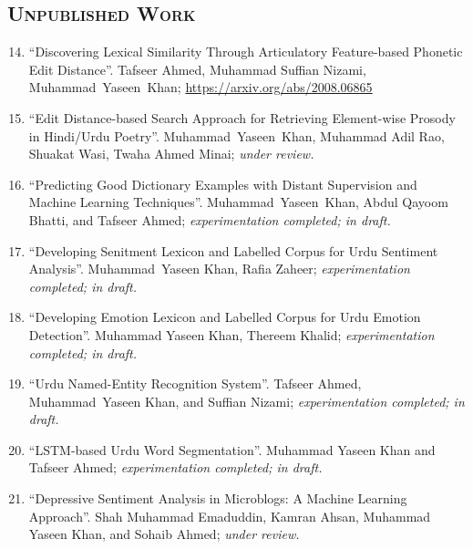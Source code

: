 \documentclass[a4paper, 10pt]{article}
\begin{document}
\subsection*{\normalfont\textsc{ Unpublished Work}}
\begin{enumerate}
\setcounter{enumi}{13}
\itemsep-4pt 

	\item ``Discovering Lexical Similarity Through Articulatory Feature-based Phonetic Edit Distance''. Tafseer Ahmed, Muhammad Suffian Nizami, \textcolor{NavyBlue}{Muhammad~Yaseen~Khan}; \url{https://arxiv.org/abs/2008.06865}

	\item ``Edit Distance-based Search Approach for Retrieving  Element-wise Prosody in Hindi/Urdu Poetry''. \textcolor{NavyBlue}{Muhammad~Yaseen~Khan}, Muhammad Adil Rao, Shuakat Wasi, Twaha Ahmed Minai; \emph{\small under review.}
	
	\item ``Predicting Good Dictionary Examples with Distant Supervision and Machine Learning Techniques''. \textcolor{NavyBlue}{Muhammad~Yaseen~Khan}, Abdul Qayoom Bhatti, and Tafseer Ahmed; \emph{\small experimentation completed; in draft.}
	
	\item ``Developing Senitment Lexicon and Labelled Corpus for Urdu Sentiment Analysis''. \textcolor{NavyBlue}{Muhammad~Yaseen Khan}, Rafia Zaheer; \emph{\small experimentation completed; in draft.}
	
	\item ``Developing Emotion Lexicon and Labelled Corpus for Urdu Emotion Detection''. \textcolor{NavyBlue}{Muhammad Yaseen Khan}, Thereem Khalid; \emph{\small experimentation completed; in draft.}
	

	\item ``Urdu Named-Entity Recognition System''. Tafseer Ahmed, \textcolor{NavyBlue}{Muhammad~Yaseen Khan}, and Suffian Nizami; \emph{\small experimentation completed; in draft.}
	
	\item ``LSTM-based Urdu Word Segmentation''. \textcolor{NavyBlue}{Muhammad Yaseen Khan} and Tafseer Ahmed; \emph{\small experimentation completed; in draft.}
	
	\item ``Depressive Sentiment Analysis in Microblogs: A Machine Learning Approach''. Shah Muhammad Emaduddin, Kamran Ahsan, \textcolor{NavyBlue}{Muhammad Yaseen Khan}, and Sohaib Ahmed; \emph{\small under review.}
	

\end{enumerate}
\end{document}
